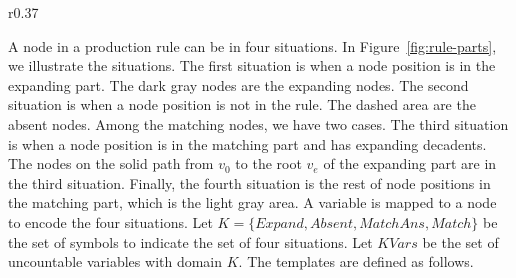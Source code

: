 \begin{wrapfigure}{r}{0.37\textwidth}
    \vspace{-3mm}
        \center
  \caption{Parts of production rules in the rule templates.}
  \label{fig:rule-parts}
  \vspace{-8mm}
\end{wrapfigure}
A node in a production rule can be in four situations.
In Figure~\ref{fig:rule-parts}, we illustrate the situations.
The first situation is when a node position is in the expanding part.
The dark gray nodes are the expanding nodes.
The second situation is when a node position is not in the rule.
The dashed area are the absent nodes.
Among the matching nodes, we have two cases.
The third situation is when a node position is in the matching part
and has expanding decadents.
The nodes on the solid path from $v_0$ to the root $v_e$ of the expanding part are in the third situation.
Finally, the fourth situation is the rest of node positions
in the matching part, which is the light gray area.
A variable is mapped to a node to encode the four situations.
Let $K =\{Expand,Absent,MatchAns,Match\}$ be the set of symbols to
indicate the set of four situations.
Let $KVars$ be the set of uncountable variables with domain $K$. 
The templates are defined as follows.



